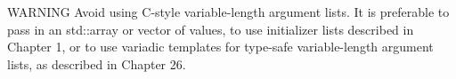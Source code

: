 \begin{myWarning}{WARNING}
Avoid using C-style variable-length argument lists. It is preferable to pass in an std::array or vector of values, to use initializer lists described in Chapter 1, or to use variadic templates for type-safe variable-length argument lists, as described in Chapter 26.
\end{myWarning}













